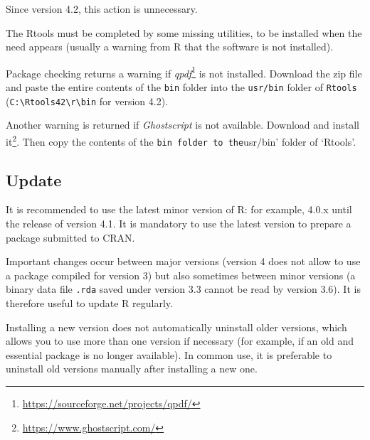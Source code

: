 \documentclass[
  12pt,
  american,
  a4paper,
  extrafontsizes,onecolumn,openright
  ]{memoir}
\newenvironment{Shaded}{\begin{snugshade}}{\end{snugshade}}
\newcommand{\AttributeTok}[1]{\textcolor[rgb]{0.77,0.63,0.00}{#1}}
\newcommand{\CommentTok}[1]{\textcolor[rgb]{0.56,0.35,0.01}{\textit{#1}}}
\newcommand{\FunctionTok}[1]{\textcolor[rgb]{0.00,0.00,0.00}{#1}}
\newcommand{\NormalTok}[1]{#1}
\newcommand{\SpecialCharTok}[1]{\textcolor[rgb]{0.00,0.00,0.00}{#1}}
\newcommand{\StringTok}[1]{\textcolor[rgb]{0.31,0.60,0.02}{#1}}
\begin{document}
\scriptsize

\begin{Shaded}
\end{Shaded}

\normalsize

Since version 4.2, this action is unnecessary.

The Rtools must be completed by some missing utilities, to be installed when the need appears (usually a warning from R that the software is not installed).

Package checking returns a warning if \emph{qpdf}\footnote{\url{https://sourceforge.net/projects/qpdf/}} is not installed.
Download the zip file and paste the entire contents of the \texttt{bin} folder into the \texttt{usr/bin} folder of \texttt{Rtools} (\texttt{C:\textbackslash{}Rtools42\textbackslash{}r\textbackslash{}bin} for version 4.2).

Another warning is returned if \emph{Ghostscript} is not available.
Download and install it\footnote{\url{https://www.ghostscript.com/}}.
Then copy the contents of the \texttt{bin\textquotesingle{}\ folder\ to\ the}usr/bin' folder of `Rtools'.

\hypertarget{update}{%
\subsection{Update}\label{update}}

It is recommended to use the latest minor version of R: for example, 4.0.x until the release of version 4.1.
It is mandatory to use the latest version to prepare a package submitted to CRAN.

Important changes occur between major versions (version 4 does not allow to use a package compiled for version 3) but also sometimes between minor versions (a binary data file \texttt{.rda} saved under version 3.3 cannot be read by version 3.6).
It is therefore useful to update R regularly.

Installing a new version does not automatically uninstall older versions, which allows you to use more than one version if necessary (for example, if an old and essential package is no longer available).
In common use, it is preferable to uninstall old versions manually after installing a new one.
\end{document}

